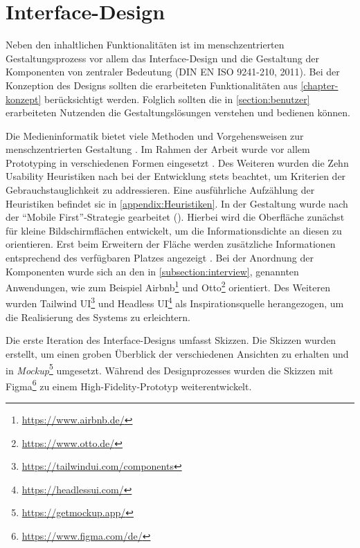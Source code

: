 \chapter{Interface-Design}
\label{chapter-design}
Neben den inhaltlichen Funktionalitäten ist im menschzentrierten
Gestaltungsprozess vor allem das Interface-Design und die Gestaltung der
Komponenten von zentraler Bedeutung \cite{DINISO9241} (DIN EN ISO 9241-210,
2011). Bei der Konzeption des Designs sollten die erarbeiteten Funktionalitäten
aus \ref{chapter-konzept} berücksichtigt werden. Folglich sollten die in
\ref{section:benutzer} erarbeiteten Nutzenden die Gestaltungslösungen verstehen
und bedienen können.

Die Medieninformatik bietet viele Methoden und Vorgehensweisen zur menschzentrierten Gestaltung
\cite{HerczegIDE2009}. Im Rahmen der Arbeit wurde vor allem Prototyping in verschiedenen Formen
eingesetzt \cite{HerczegMDI2009}. Des Weiteren wurden die Zehn Usability Heuristiken nach
 bei der Entwicklung stets beachtet, um Kriterien der
Gebrauchstauglichkeit zu addressieren. Eine ausführliche Aufzählung der Heuristiken befindet sic in
\ref{appendix:Heuristiken}. In der Gestaltung wurde nach der \enquote{Mobile First}-Strategie
gearbeitet (). Hierbei wird die Oberfläche zunächst für kleine Bildschirmflächen
entwickelt, um die Informationsdichte an diesen zu orientieren. Erst beim Erweitern der Fläche
werden zusätzliche Informationen entsprechend des verfügbaren Platzes angezeigt
\cite{kim_chapter_2013}. Bei der Anordnung der Komponenten wurde sich an den in
\ref{subsection:interview}, genannten Anwendungen, wie zum Beispiel
Airbnb\footnote{\url{https://www.airbnb.de/}} und Otto\footnote{\url{https://www.otto.de/}}
orientiert. Des Weiteren wurden Tailwind UI\footnote{\url{https://tailwindui.com/components}} und
Headless UI\footnote{\url{https://headlessui.com/}} als Inspirationsquelle herangezogen, um die
Realisierung des Systems zu erleichtern.

Die erste Iteration des Interface-Designs umfasst Skizzen. Die Skizzen wurden
erstellt, um einen groben Überblick der verschiedenen Ansichten zu erhalten und
in \textit{Mockup}\footnote{\url{https://getmockup.app/}} umgesetzt. Während des
Designprozesses wurden die Skizzen mit
Figma\footnote{\url{https://www.figma.com/de/}} zu einem High-Fidelity-Prototyp
weiterentwickelt.


